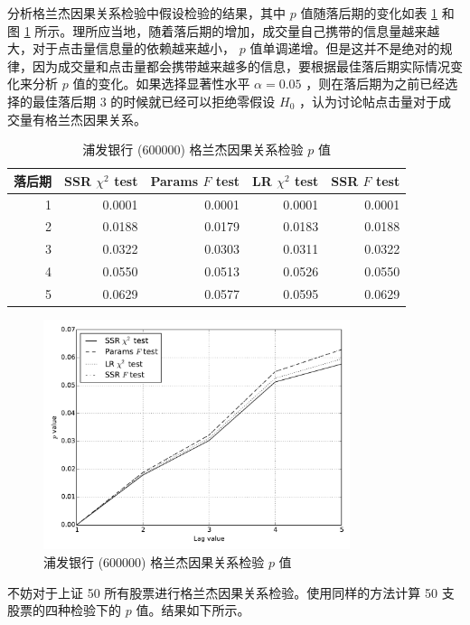 分析格兰杰因果关系检验中假设检验的结果，其中 $p$ 值随落后期的变化如表 \ref{f_test:10} 和图 \ref{f_test:11} 所示。理所应当地，随着落后期的增加，成交量自己携带的信息量越来越大，对于点击量信息量的依赖越来越小， $p$ 值单调递增。但是这并不是绝对的规律，因为成交量和点击量都会携带越来越多的信息，要根据最佳落后期实际情况变化来分析 $p$ 值的变化。如果选择显著性水平 $\alpha=0.05$ ，则在落后期为之前已经选择的最佳落后期 $3$ 的时候就已经可以拒绝零假设 $H_{0}$ ，认为讨论帖点击量对于成交量有格兰杰因果关系。

\begin{table}
  \centering
  \caption{浦发银行 (600000) 格兰杰因果关系检验 $p$ 值}
  \label{f_test:10}
  \begin{tabular}{rrrrr}
    \toprule
    落后期 & SSR $\chi^{2}$ test & Params $F$ test & LR $\chi^{2}$ test & SSR $F$ test \\
    \midrule
    1 & 0.0001 & 0.0001 & 0.0001 & 0.0001 \\
    2 & 0.0188 & 0.0179 & 0.0183 & 0.0188 \\
    3 & 0.0322 & 0.0303 & 0.0311 & 0.0322 \\
    4 & 0.0550 & 0.0513 & 0.0526 & 0.0550 \\
    5 & 0.0629 & 0.0577 & 0.0595 & 0.0629 \\
    \bottomrule
  \end{tabular}
\end{table}

\begin{figure}
  \centering
  \includegraphics[width=0.8\textwidth]{plots/granger_causality_test_1.pdf}
  \caption{浦发银行 (600000) 格兰杰因果关系检验 $p$ 值}
  \label{f_test:11}
\end{figure}

不妨对于上证 50 所有股票进行格兰杰因果关系检验。使用同样的方法计算 50 支股票的四种检验下的 $p$ 值。结果如下所示。

